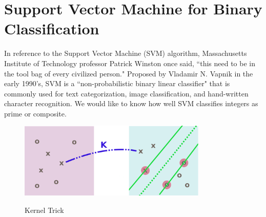 \documentclass[10pt, titlepage]{amsart}
\theoremstyle{definition}
\newtheorem{definition}{Definition}[subsection]
\begin{document}
%	
%	
%	
%	
%	
%	
	

		
	\section{Support Vector Machine for Binary Classification}\label{svm}

		
	In reference to the Support Vector Machine (SVM) algorithm, Massachusetts Institute of Technology professor Patrick Winston once said, ``this need to be in the tool bag of every civilized person." \cite{mit} Proposed by Vladamir N. Vapnik in the early 1990's, SVM is a ``non-probabilistic binary linear classifier"\cite{wiki:svm} that is commonly used for text categorization, image classification, and hand-written character recognition. We would like to know how well SVM classifies integers as prime or composite.
	
	\begin{figure}
		\caption{Kernel Trick}
		\centering
			\includegraphics[width=0.8\textwidth]{svm_graph}
		\label{figure:svm_graph}		
	\end{figure}
	
\end{document}
